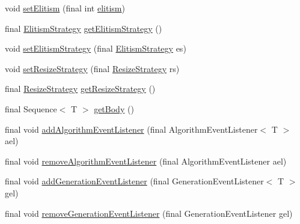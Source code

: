 \begin{CompactItemize}
\item 
void \hyperlink{classjenes_1_1_genetic_algorithm_3_01_t_01extends_01_chromosome_01_4_27f67506714b18eb15d890bfa3d5b0ab}{setElitism} (final int \hyperlink{classjenes_1_1_genetic_algorithm_3_01_t_01extends_01_chromosome_01_4_c4280b01e7da0ddc049050b19e28b8b9}{elitism})
\item 
final \hyperlink{classjenes_1_1_genetic_algorithm_3_01_t_01extends_01_chromosome_01_4_afb755e144130d2c2c6ca86134dd871e}{ElitismStrategy} \hyperlink{classjenes_1_1_genetic_algorithm_3_01_t_01extends_01_chromosome_01_4_d227ba9924206ee18f69d24ea4ee4ab0}{getElitismStrategy} ()
\item 
void \hyperlink{classjenes_1_1_genetic_algorithm_3_01_t_01extends_01_chromosome_01_4_edc89ba915f6a528ef4052eb31a8c467}{setElitismStrategy} (final \hyperlink{classjenes_1_1_genetic_algorithm_3_01_t_01extends_01_chromosome_01_4_afb755e144130d2c2c6ca86134dd871e}{ElitismStrategy} es)
\item 
void \hyperlink{classjenes_1_1_genetic_algorithm_3_01_t_01extends_01_chromosome_01_4_685af9b6322920d9431977fd25c5cf77}{setResizeStrategy} (final \hyperlink{classjenes_1_1_genetic_algorithm_3_01_t_01extends_01_chromosome_01_4_49749d00b9417b958d1b30e08fc21d53}{ResizeStrategy} rs)
\item 
final \hyperlink{classjenes_1_1_genetic_algorithm_3_01_t_01extends_01_chromosome_01_4_49749d00b9417b958d1b30e08fc21d53}{ResizeStrategy} \hyperlink{classjenes_1_1_genetic_algorithm_3_01_t_01extends_01_chromosome_01_4_379c5a3789ba72941a081d32fbcc4474}{getResizeStrategy} ()
\item 
final Sequence$<$ T $>$ \hyperlink{classjenes_1_1_genetic_algorithm_3_01_t_01extends_01_chromosome_01_4_eab54a329fb6df5686a2fce4a8a8727a}{getBody} ()
\item 
final void \hyperlink{classjenes_1_1_genetic_algorithm_3_01_t_01extends_01_chromosome_01_4_168e2b37b5351108e62d8fb887e1fae4}{addAlgorithmEventListener} (final AlgorithmEventListener$<$ T $>$ ael)
\item 
final void \hyperlink{classjenes_1_1_genetic_algorithm_3_01_t_01extends_01_chromosome_01_4_8cab61e04f54ed5abbda047815a1683d}{removeAlgorithmEventListener} (final AlgorithmEventListener ael)
\item 
final void \hyperlink{classjenes_1_1_genetic_algorithm_3_01_t_01extends_01_chromosome_01_4_a39f1ae905e67a5a3f7d7ad5cb25d276}{addGenerationEventListener} (final GenerationEventListener$<$ T $>$ gel)
\item 
final void \hyperlink{classjenes_1_1_genetic_algorithm_3_01_t_01extends_01_chromosome_01_4_33e632148218289d0bc43e202a804bf1}{removeGenerationEventListener} (final GenerationEventListener gel)

\end{CompactItemize}
